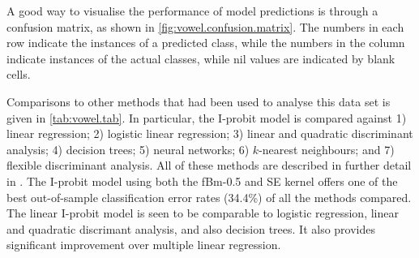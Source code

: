 \documentclass[a4paper,showframe,11pt]{report}\usepackage[]{graphicx}\usepackage[]{color}
\begin{document}
A good way to visualise the performance of model predictions is through a confusion matrix, as shown in \cref{fig:vowel.confusion.matrix}.
The numbers in each row indicate the instances of a predicted class, while the numbers in the column indicate instances of the actual classes, while nil values are indicated by blank cells.

Comparisons to other methods that had been used to analyse this data set is given in \cref{tab:vowel.tab}.
In particular, the I-probit model is compared against 1) linear regression; 2) logistic linear regression; 3) linear and quadratic discriminant analysis; 4) decision trees; 5) neural networks; 6) $k$-nearest neighbours; and 7) flexible discriminant analysis.
All of these methods are described in further detail in \citet[Ch.4 \& 12, Table 12.3]{friedman2001elements}.
The I-probit model using both the fBm-0.5 and SE kernel offers one of the best out-of-sample classification error rates (34.4\%) of all the methods compared.
The linear I-probit model is seen to be comparable to logistic regression, linear and quadratic discrimant analysis, and also decision trees.
It also provides significant improvement over multiple linear regression.
\end{document}
